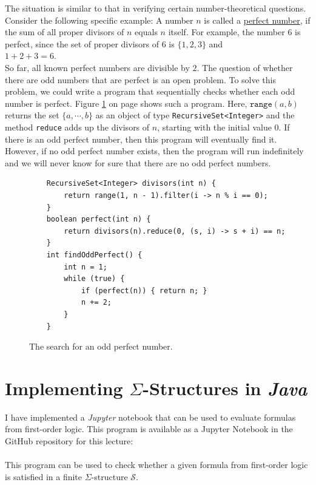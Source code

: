 The situation is similar to that in verifying certain number-theoretical
questions. Consider the following specific example: A number $n$ is called 
a \href{https://en.wikipedia.org/wiki/Perfect_number}{perfect number},
if the sum of all proper divisors of $n$ equals $n$ itself. For example, the number $6$ is perfect, since the set of proper divisors of $6$ is $\{1,2,3\}$ and 
\\[0.2cm]
\hspace*{1.3cm}
$1 + 2 + 3 = 6$.
\\[0.2cm]
So far, all known perfect numbers are divisible by $2$. The question of whether there are
odd numbers that are perfect is an open  problem. To solve this
problem, we could write a program that sequentially checks whether each
odd number is perfect. Figure \ref{fig:Find-Perfect.ipynb}
on page \pageref{fig:Find-Perfect.ipynb} shows such a program.  Here, $\texttt{range}(a, b)$ returns the set
$\{a, \cdots, b\}$ as an object of type \texttt{RecursiveSet<Integer>} and the method \texttt{reduce} adds up the
divisors of $n$, starting with the initial value $0$. If there is an odd perfect number,
then this program will eventually find it. However, if no
odd perfect number exists, then the program will run indefinitely and
we will never know for sure that there are no odd perfect numbers.

\begin{figure}[!ht]
  \centering
\begin{verbatim}
    RecursiveSet<Integer> divisors(int n) {
        return range(1, n - 1).filter(i -> n % i == 0);
    }
    boolean perfect(int n) {
        return divisors(n).reduce(0, (s, i) -> s + i) == n;
    }
    int findOddPerfect() {
        int n = 1;
        while (true) {
            if (perfect(n)) { return n; }
            n += 2;
        }
    }
\end{verbatim}
\vspace*{-0.3cm}
  \caption{The search for an odd perfect number.}
  \label{fig:Find-Perfect.ipynb}
\end{figure} 

\section{Implementing $\Sigma$-Structures in \textsl{Java}}
I have implemented a \textsl{Jupyter} notebook that can be used to evaluate formulas from first-order logic.
This program is available as a Jupyter Notebook in the GitHub repository for this lecture:
\\[0.2cm]
\hspace*{1.3cm}
\href{https://github.com/karlstroetmann/Logic/blob/master/Java/Chapter-5/01-FOL-Evaluation.ipynb}{}
\\[0.2cm]
This program can be used to check whether a given formula from first-order logic is satisfied in a finite
$\Sigma$-structure $\mathcal{S}$.

